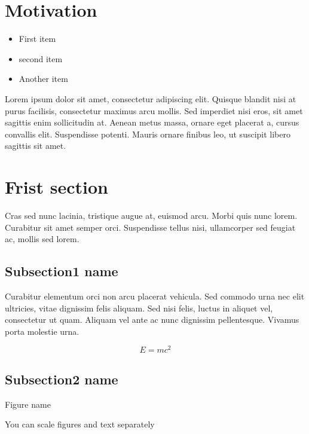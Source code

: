 \documentclass[final]{beamer}
\author{Author One$^1$ and Author Two$^2$}
\institute{$^1$ Institution1, $^2$ Institution2}
\begin{document}
\begin{poster}
\newcolumn

\section{Motivation} \justifying
\begin{itemize}
    \item First item
    \item second item
    \item Another item
\end{itemize}

Lorem ipsum dolor sit amet, consectetur adipiscing elit. Quisque blandit nisi at purus facilisis, consectetur maximus arcu mollis. Sed imperdiet nisi eros, sit amet sagittis enim sollicitudin at. Aenean metus massa, ornare eget placerat a, cursus convallis elit. Suspendisse potenti. Mauris ornare finibus leo, ut suscipit libero sagittis sit amet. 

\section{Frist section}
Cras sed nunc lacinia, tristique augue at, euismod arcu. Morbi quis nunc lorem. Curabitur sit amet semper orci. Suspendisse tellus nisi, ullamcorper sed feugiat ac, mollis sed lorem.
 
\subsection{Subsection1 name}

 Curabitur elementum orci non arcu placerat vehicula. Sed commodo urna nec elit ultricies, vitae dignissim felis aliquam. Sed nisi felis, luctus in aliquet vel, consectetur ut quam. Aliquam vel ante ac nunc dignissim pellentesque. Vivamus porta molestie urna.

$$
E = mc^2
$$

\subsection{Subsection2 name}
{\centering

\caption{Figure name}
\vspace{1ex}

\vspace{2ex}
\caption{You can scale figures and text separately}

}
\end{poster}
\end{document}
